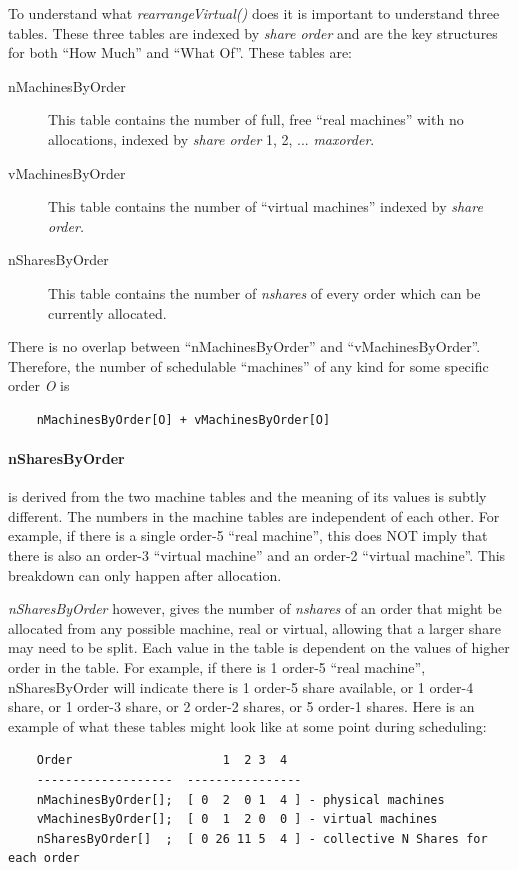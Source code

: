     To understand what {\em rearrangeVirtual()} does it is important to understand three tables.
    These three tables are indexed by {\em share order} and are the key structures for both ``How
    Much'' and ``What Of''.  These tables are:
    \begin{description}
      \item[nMachinesByOrder] This table contains the number of full, free ``real machines'' with no allocations,
        indexed by {\em share order} 1, 2, ... {\em maxorder}.
      \item[vMachinesByOrder] This table contains the number of ``virtual machines'' indexed by {\em share order.}
      \item[nSharesByOrder]  This table contains the number of {\em nshares} of every order which can be
        currently allocated.
    \end{description}
    
    There is no overlap between ``nMachinesByOrder'' and ``vMachinesByOrder''. Therefore, the number
    of schedulable ``machines'' of any kind for some specific order {\em O} is
\begin{verbatim}
    nMachinesByOrder[O] + vMachinesByOrder[O]
\end{verbatim}

\paragraph{nSharesByOrder} is derived from the two machine tables and the meaning of its values
    is subtly different.  The numbers in the machine tables are independent of each other.  For example, if
    there is a single order-5 ``real machine'', this does NOT imply that there is also an order-3
    ``virtual machine'' and an order-2 ``virtual machine''.  This breakdown can only happen after
    allocation.

    {\em nSharesByOrder} however, gives the number of {\em nshares} of an order that might be
    allocated from any possible machine, real or virtual, allowing that a larger share may need to
    be split.  Each value in the table is dependent on the values of higher order in the table.  For
    example, if there is 1 order-5 ``real machine'', nSharesByOrder will indicate there is 1
    order-5 share available, or 1 order-4 share, or 1 order-3 share, or 2 order-2 shares, or 5
    order-1 shares.  Here is an example of what these tables might look like at some point during scheduling:
\begin{verbatim}
    Order                     1  2 3  4
    -------------------  ----------------
    nMachinesByOrder[];  [ 0  2  0 1  4 ] - physical machines
    vMachinesByOrder[];  [ 0  1  2 0  0 ] - virtual machines
    nSharesByOrder[]  ;  [ 0 26 11 5  4 ] - collective N Shares for each order
\end{verbatim}
    
